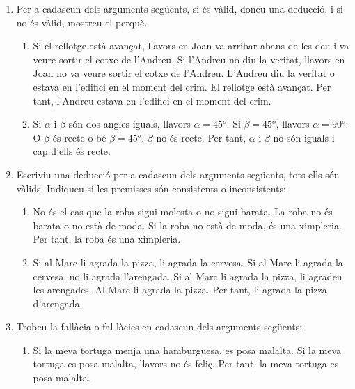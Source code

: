 \begin{enumerate}
\item Per a cadascun dels arguments seg\"{u}ents, si \'{e}s v\`{a}lid, doneu
una deducci\'{o}, i si no \'{e}s v\`{a}lid, mostreu el perqu\`{e}.

\begin{enumerate}
\item Si el rellotge est\`{a} avan\c{c}at, llavors en Joan va arribar abans de
les deu i va veure sortir el cotxe de l'Andreu. Si l'Andreu no diu la veritat,
llavors en Joan no va veure sortir el cotxe de l'Andreu. L'Andreu diu la
veritat o estava en l'edifici en el moment del crim. El rellotge est\`{a}
avan\c{c}at. Per tant, l'Andreu estava en l'edifici en el moment del crim.

\item Si $\alpha$ i $\beta$ s\'{o}n dos angles iguals, llavors $\alpha=45%
{{}^o}%
$. Si $\beta=45%
{{}^o}%
$, llavors $\alpha=90%
{{}^o}%
$. O $\beta$ \'{e}s recte o b\'{e} $\beta=45%
{{}^o}%
$. $\beta$ no \'{e}s recte. Per tant, $\alpha$ i $\beta$ no s\'{o}n iguals i
cap d'ells \'{e}s recte.
\end{enumerate}

\item Escriviu una deducci\'{o} per a cadascun dels arguments seg\"{u}ents,
tots ells s\'{o}n v\`{a}lids. Indiqueu si les premisses s\'{o}n consistents o inconsistents:

\begin{enumerate}
\item No \'{e}s el cas que la roba sigui molesta o no sigui barata. La roba no
\'{e}s barata o no est\`{a} de moda. Si la roba no est\`{a} de moda, \'{e}s
una ximpleria. Per tant, la roba \'{e}s una ximpleria.

\item Si al Marc li agrada la pizza, li agrada la cervesa. Si al Marc li
agrada la cervesa, no li agrada l'arengada. Si al Marc li agrada la pizza, li
agraden les arengades. Al Marc li agrada la pizza. Per tant, li agrada la
pizza d'arengada.
\end{enumerate}

\item Trobeu la fal\textperiodcentered l\`{a}cia o fal\textperiodcentered
l\`{a}cies en cadascun dels arguments seg\"{u}ents:

\begin{enumerate}
\item Si la meva tortuga menja una hamburguesa, es posa malalta. Si la meva
tortuga es posa malalta, llavors no \'{e}s feli\c{c}. Per tant, la meva
tortuga es posa malalta.


\end{enumerate}
\end{enumerate}
